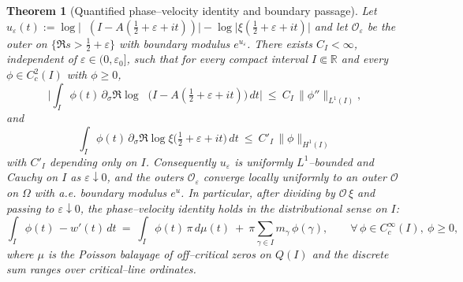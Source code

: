 \documentclass[11pt]{article}
\newtheorem{theorem}{Theorem}
\theoremstyle{definition}
\theoremstyle{remark}
\newcommand{\R}{\mathbb{R}}
\DeclareMathOperator{\dettwo}{det_2}
\begin{document}
\begin{theorem}[Quantified phase–velocity identity and boundary passage]\label{thm:phase-velocity-quant}
Let $u_\varepsilon(t):=\log\big|\dettwo(I-A(\tfrac12+\varepsilon+it))\big| - \log\big|\xi(\tfrac12+\varepsilon+it)\big|$ and let $\mathcal O_\varepsilon$ be the outer on $\{\Re s>\tfrac12+\varepsilon\}$ with boundary modulus $e^{u_\varepsilon}$. There exists $C_I<\infty$, independent of $\varepsilon\in(0,\varepsilon_0]$, such that for every compact interval $I\Subset\R$ and every $\phi\in C_c^2(I)$ with $\phi\ge 0$,
\[
 \Big|\int_I \phi(t)\,\partial_\sigma\Re\log\dettwo\big(I-A(\tfrac12+\varepsilon+it)\big)\,dt\Big|\ \le\ C_I\,\|\phi''\|_{L^1(I)},
\]
and
\[
 \int_I \phi(t)\,\partial_\sigma\Re\log\xi\big(\tfrac12+\varepsilon+it\big)\,dt\ \le\ C'_I\,\|\phi\|_{H^1(I)}
\]
with $C'_I$ depending only on $I$. Consequently $u_\varepsilon$ is uniformly $L^1$–bounded and Cauchy on $I$ as $\varepsilon\downarrow 0$, and the outers $\mathcal O_\varepsilon$ converge locally uniformly to an outer $\mathcal O$ on $\Omega$ with a.e. boundary modulus $e^{u}$. In particular, after dividing by $\mathcal O\,\xi$ and passing to $\varepsilon\downarrow 0$, the phase–velocity identity holds in the distributional sense on $I$:
\[
 \int_I \phi(t)\,-w'(t)\,dt\ =\ \int_I \phi(t)\,\pi\,d\mu(t)\ +\ \pi\sum_{\gamma\in I} m_\gamma\,\phi(\gamma),\qquad \forall\,\phi\in C_c^\infty(I),\ \phi\ge 0,
\]
where $\mu$ is the Poisson balayage of off–critical zeros on $Q(I)$ and the discrete sum ranges over critical–line ordinates.
\end{theorem}
\end{document}
